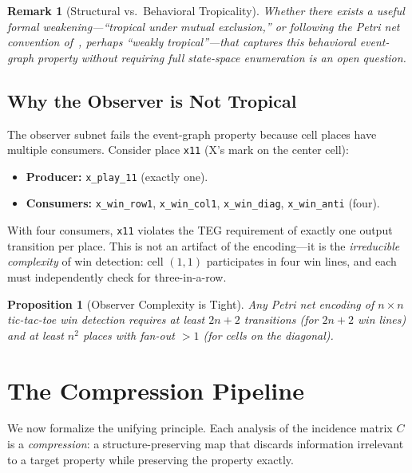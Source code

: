 \documentclass[11pt,a4paper]{article}
\newtheorem{remark}[theorem]{Remark}
\newtheorem{proposition}[theorem]{Proposition}
\begin{document}
\begin{remark}[Structural vs.\ Behavioral Tropicality]
Whether there exists a useful formal weakening---``tropical under mutual exclusion,'' or following the Petri net convention of~\cite{desel1995}, perhaps ``weakly tropical''---that captures this behavioral event-graph property without requiring full state-space enumeration is an open question.
\end{remark}

\subsection{Why the Observer is Not Tropical}

The observer subnet fails the event-graph property because cell places have multiple consumers.
Consider place \texttt{x11} (X's mark on the center cell):
\begin{itemize}
  \item \textbf{Producer:} \texttt{x\_play\_11} (exactly one).
  \item \textbf{Consumers:} \texttt{x\_win\_row1}, \texttt{x\_win\_col1}, \texttt{x\_win\_diag}, \texttt{x\_win\_anti} (four).
\end{itemize}

With four consumers, \texttt{x11} violates the TEG requirement of exactly one output transition per place.
This is not an artifact of the encoding---it is the \emph{irreducible complexity} of win detection: cell $(1,1)$ participates in four win lines, and each must independently check for three-in-a-row.

\begin{proposition}[Observer Complexity is Tight]
\label{prop:observer-tight}
Any Petri net encoding of $n \times n$ tic-tac-toe win detection requires at least $2n + 2$ transitions (for $2n + 2$ win lines) and at least $n^2$ places with fan-out $> 1$ (for cells on the diagonal).
\end{proposition}

\section{The Compression Pipeline}
\label{sec:compression}

We now formalize the unifying principle.
Each analysis of the incidence matrix $C$ is a \emph{compression}: a structure-preserving map that discards information irrelevant to a target property while preserving the property exactly.
\end{document}
